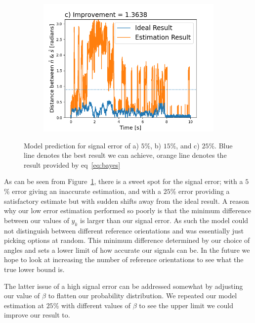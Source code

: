 \documentclass[final, 3p]{elsarticle}
\begin{document}
\begin{figure}[h]
\begin{subfigure}{0.32\textwidth}
		\includegraphics[width=\textwidth]{./Images/fig5c.png}
	\end{subfigure}
	\caption{Model prediction for signal error of a) $5\%$, b) $15\%$, and c) $25\%$. Blue line denotes the best result we can achieve, orange line denotes the result provided by eq~\ref{eq:bayes}}
	\label{fig:epsilon}
\end{figure}


As can be seen from Figure~\ref{fig:epsilon}, there is a sweet spot for the signal error; with a $5$\% error giving an inaccurate estimation, and with a $25$\% error providing a satisfactory estimate but with sudden shifts away from the ideal result. A reason why our low error estimation performed so poorly is that the minimum difference between our values of $y_k$ is larger than our signal error. As such the model could not distinguish between different reference orientations and was essentially just picking options at random. This minimum difference determined by our choice of angles and sets a lower limit of how accurate our signals can be. In the future we hope to look at increasing the number of reference orientations to see what the true lower bound is.

The latter issue of a high signal error can be addressed somewhat by adjusting our value of $\beta$ to flatten our probability distribution. We repeated our model estimation at $25\%$ with different values of $\beta$ to see the upper limit we could improve our result to.
\end{document}
